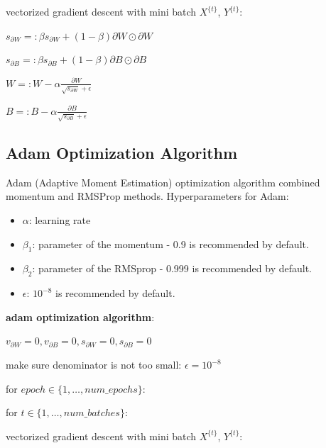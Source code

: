 \documentclass{article}
\begin{document}
\noindent \hspace{1cm} vectorized gradient descent with mini batch \(X^{\{t\}}\), \(Y^{\{t\}}\):

\noindent \hspace{1cm} \(s_{\partial W} =: \beta s_{\partial W} + (1 - \beta) \partial W \odot \partial W\)

\noindent \hspace{1cm} \(s_{\partial B} =: \beta s_{\partial B} + (1 - \beta) \partial B \odot \partial B\)

\noindent \hspace{1cm} \(W =: W - \alpha \frac{\partial W}{\sqrt{s_{\partial W}} + \epsilon}\)

\noindent \hspace{1cm} \(B =: B - \alpha \frac{\partial B}{\sqrt{s_{\partial B}} + \epsilon}\)

\subsection{Adam Optimization Algorithm}

\noindent Adam (Adaptive Moment Estimation) optimization algorithm combined momentum and RMSProp methods. Hyperparameters for Adam:

\begin{itemize}
    \item \(\alpha\): learning rate
    \item \(\beta_{1}\): parameter of the momentum - 0.9 is recommended by default.
    \item \(\beta_{2}\): parameter of the RMSprop - 0.999 is recommended by default.
    \item \(\epsilon\): \(10^{-8}\) is recommended by default.
\end{itemize}

\noindent \textbf{adam optimization algorithm}:

\noindent \(v_{\partial W} = 0, v_{\partial B} = 0, s_{\partial W} = 0, s_{\partial B} = 0\)

\noindent make sure denominator is not too small: \(\epsilon = 10^{-8}\)

\noindent for \(epoch \in \{1, \dots, num\_epochs\}\):

\noindent \hspace{.5cm} for \(t \in \{1, \dots, num\_batches\}\):

\noindent \hspace{1cm} vectorized gradient descent with mini batch \(X^{\{t\}}\), \(Y^{\{t\}}\):
\end{document}
